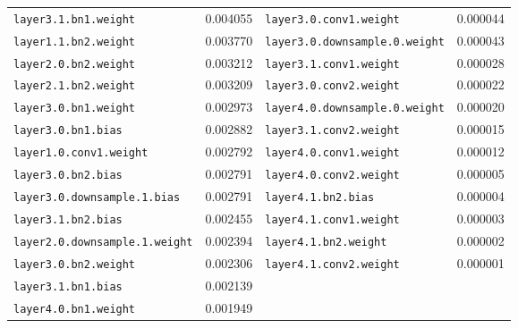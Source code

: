 \documentclass{article}
\theoremstyle{plain}
\theoremstyle{definition}
\theoremstyle{remark}
\begin{document}
\begin{table}[t]
\begin{small}
\begin{sc}
\begin{tabular}{lclc}
\texttt{layer3.1.bn1.weight} & 0.004055 & \texttt{layer3.0.conv1.weight} & 0.000044 \\
\texttt{layer1.1.bn2.weight} & 0.003770 & \texttt{layer3.0.downsample.0.weight} & 0.000043 \\
\texttt{layer2.0.bn2.weight} & 0.003212 & \texttt{layer3.1.conv1.weight} & 0.000028 \\
\texttt{layer2.1.bn2.weight} & 0.003209 & \texttt{layer3.0.conv2.weight} & 0.000022 \\
\texttt{layer3.0.bn1.weight} & 0.002973 & \texttt{layer4.0.downsample.0.weight} & 0.000020 \\
\texttt{layer3.0.bn1.bias} & 0.002882 & \texttt{layer3.1.conv2.weight} & 0.000015 \\
\texttt{layer1.0.conv1.weight} & 0.002792 & \texttt{layer4.0.conv1.weight} & 0.000012 \\
\texttt{layer3.0.bn2.bias} & 0.002791 & \texttt{layer4.0.conv2.weight} & 0.000005 \\
\texttt{layer3.0.downsample.1.bias} & 0.002791 & \texttt{layer4.1.bn2.bias} & 0.000004 \\
\texttt{layer3.1.bn2.bias} & 0.002455 & \texttt{layer4.1.conv1.weight} & 0.000003 \\
\texttt{layer2.0.downsample.1.weight} & 0.002394 & \texttt{layer4.1.bn2.weight} & 0.000002 \\
\texttt{layer3.0.bn2.weight} & 0.002306 & \texttt{layer4.1.conv2.weight} & 0.000001 \\
\texttt{layer3.1.bn1.bias} & 0.002139 & & \\
\texttt{layer4.0.bn1.weight} & 0.001949 & & \\
\bottomrule
\end{tabular}
\end{sc}
\end{small}
\end{table}
\end{document}
